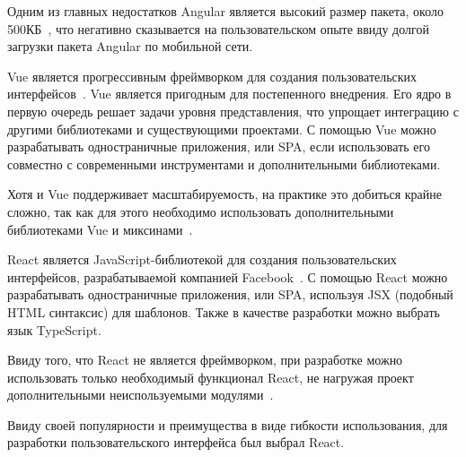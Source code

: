 Одним из главных недостатков Angular является высокий размер пакета, около 500КБ~\cite{stateofjs}, что негативно сказывается на пользовательском опыте ввиду долгой загрузки пакета Angular по мобильной сети.

Vue является прогрессивным фреймворком для создания пользовательских интерфейсов~\cite{vue}. Vue является пригодным для постепенного внедрения. Его ядро в первую очередь решает задачи уровня представления, что упрощает интеграцию с другими библиотеками и существующими проектами. С помощью Vue можно разрабатывать одностраничные приложения, или SPA, если использовать его совместно с современными инструментами и дополнительными библиотеками.

Хотя и Vue поддерживает масштабируемость, на практике это добиться крайне сложно, так как для этого необходимо использовать дополнительными библиотеками Vue и миксинами~\cite{vue}.

React является JavaScript-библиотекой для создания пользовательских интерфейсов, разрабатываемой компанией Facebook~\cite{react}. С помощью React можно разрабатывать одностраничные приложения, или SPA, используя JSX (подобный HTML синтаксис) для шаблонов. Также в качестве разработки можно выбрать язык TypeScript.

Ввиду того, что React не является фреймворком, при разработке можно использовать только необходимый функционал React, не нагружая проект дополнительными неиспользуемыми модулями~\cite{react}.

Ввиду своей популярности и преимущества в виде гибкости использования, для разработки пользовательского интерфейса был выбрал React.